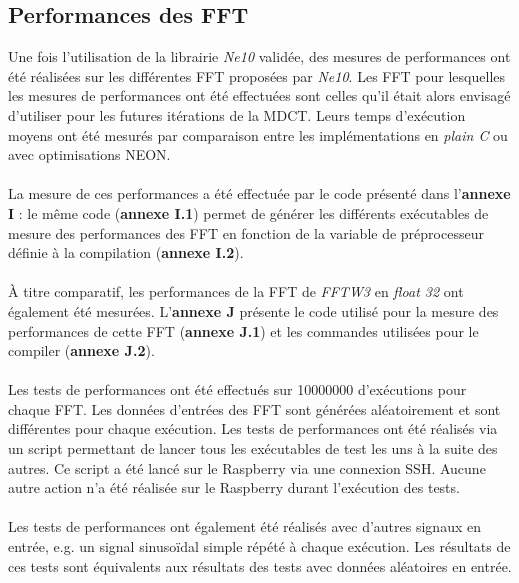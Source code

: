 \documentclass{article}
\begin{document}


    \subsection{Performances des FFT}
    \label{sec:fft_perfs}
    Une fois l'utilisation de la librairie \emph{Ne10} validée, des mesures de performances ont été réalisées sur les différentes FFT proposées par \emph{Ne10}. Les FFT pour lesquelles les mesures de performances ont été effectuées sont celles qu'il était alors envisagé d'utiliser pour les futures itérations de la MDCT. Leurs temps d'exécution moyens ont été mesurés par comparaison entre les implémentations en \emph{plain C} ou avec optimisations NEON.

    \paragraph{}
    La mesure de ces performances a été effectuée par le code présenté dans l'\textbf{annexe I} : le même code (\textbf{annexe I.1}) permet de générer les différents exécutables de mesure des performances des FFT en fonction de la variable de préprocesseur définie à la compilation (\textbf{annexe I.2}).

    \paragraph{}
    À titre comparatif, les performances de la FFT de \emph{FFTW3} en \emph{float 32} ont également été mesurées. L'\textbf{annexe J} présente le code utilisé pour la mesure des performances de cette FFT (\textbf{annexe J.1}) et les commandes utilisées pour le compiler (\textbf{annexe J.2}).

    \paragraph{}
    Les tests de performances ont été effectués sur \SI{10000000}{} d'exécutions pour chaque FFT. Les données d'entrées des FFT sont générées aléatoirement et sont différentes pour chaque exécution. Les tests de performances ont été réalisés via un script permettant de lancer tous les exécutables de test les uns à la suite des autres. Ce script a été lancé sur le Raspberry via une connexion SSH. Aucune autre action n'a été réalisée sur le Raspberry durant l'exécution des tests.

    \paragraph{}
    Les tests de performances ont également été réalisés avec d'autres signaux en entrée, e.g. un signal sinusoïdal simple répété à chaque exécution. Les résultats de ces tests sont équivalents aux résultats des tests avec données aléatoires en entrée.
    
\end{document}
